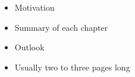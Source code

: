 


\makeatletter
\renewcommand{\@makefnmark}{{\sufigures\@makefnmarkorig}}
\makeatother

\noindent%

\begin{itemize}
    \item Motivation
    \item Summary of each chapter
    \item Outlook
    
    \item Usually two to three pages long
\end{itemize}

\cite{Gerhardt2017} 

\cite{Abbring2007}
